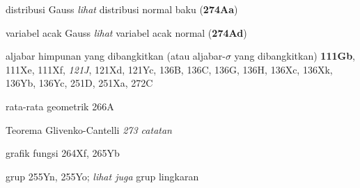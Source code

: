 







distribusi Gauss
  {\it lihat} distribusi normal baku ({\bf 274Aa})








variabel acak Gauss {\it lihat} variabel acak normal ({\bf 274Ad})











aljabar himpunan yang dibangkitkan (atau aljabar-$\sigma$ yang \nobreak dibangkitkan) {\bf 111Gb}, 111Xe, 111Xf,
{\it 121J}, 121Xd, 121Yc, 136B, 136C, 136G, 136H, 136Xc, 136Xk,
136Yb, 136Yc,
  251D, 251Xa, 272C







rata-rata geometrik 266A
















Teorema Glivenko-Cantelli {\it 273 catatan}



















grafik fungsi 264Xf, 265Yb












grup 255Yn, 255Yo;
  {\it lihat juga} grup lingkaran












